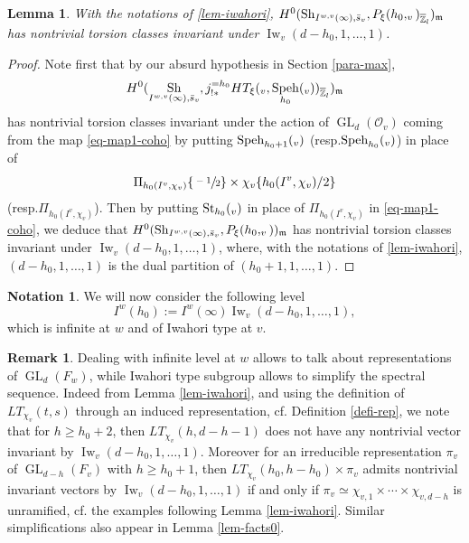 \documentclass[11pt]{article}
\makeatletter
\newcommand{\cf}{cf.\xspace}
\newcommand{\resp}{resp.\xspace}
\DeclareRobustCommand{\mathbbm}[1]{\csname jepbb@#1\endcsname}
\let\mathds\mathbbm
\DeclareMathOperator{\GL}{GL}
\theoremstyle{plain}
\newtheorem{lemma}[equation]{Lemma}
\theoremstyle{definition}
\newtheorem*{remark}{Remark}
\newtheorem{nota}[equation]{Notation}
\numberwithin{equation}{subsection}
\newcommand\Zm{{\mathbb Z}}
\newcommand\OC{{\mathcal O}}
\DeclareMathOperator{\sh}{Sh}
\DeclareMathOperator{\Iw}{Iw}
\DeclareMathOperator{\speh}{Speh}
\DeclareMathOperator{\st}{St}
\let \oo=\infty
\makeatother
\begin{document}
\begin{lemma} \label{lem-oo-finite}
With the notations of \ref{lem-iwahori},
$H^0(\sh_{I^{w,v}(\oo),\bar s_v},P_\xi(h_0,\mathds 1_v)_{\overline \Zm_l})_{\mathfrak m}$ has nontrivial torsion
classes invariant under $\Iw_v(d-h_0,1,\dots,1)$.
\end{lemma}

\begin{proof}
Note first that by our absurd hypothesis in Section \ref{para-max},
\[
H^0(\sh_{I^{w,v}(\oo),\bar s_v},j^{=h_0}_{!*}
HT_\xi(\mathds 1_v,\speh_{h_0}(\mathds 1_v))_{\overline \Zm_l})_{\mathfrak m}
\]
has
nontrivial torsion classes invariant under the action of $\GL_d(\OC_v)$ coming
from the map \eqref{eq-map1-coho} by putting
$\speh_{h_0+1}(\mathds 1_v)$ (\resp $\speh_{h_0}(\mathds 1_v)$)
in place of
\[
\Pi_{h_0(I^v,\chi_v)} \{\sfrac{-1}{2}\} \times \chi_v \{h_0(I^v,\chi_v)/2\}
\]
(\resp $\Pi_{h_0(I^v,\chi_v)}$).
Then by putting $\st_{h_0}(\mathds 1_v)$ in place of $\Pi_{h_0(I^v,\chi_v)}$
in \eqref{eq-map1-coho}, we deduce that
$H^0(\sh_{I^{w,v}(\oo),\bar s_v},P_\xi(h_0,\mathds 1_v))_{\mathfrak m}$ has nontrivial torsion
classes invariant under $\Iw_v(d-h_0,1,\dots,1)$, where, with
the notations of \ref{lem-iwahori}, $(d-h_0,1,\dots,1)$ is the dual
partition of $(h_0+1,1,\dots,1)$.
\end{proof}

\begin{nota}
We will now consider the following level
\[
I^w(h_0):=I^w(\oo) \Iw_v(d-h_0,1,\dots,1),
\]
which is infinite at $w$ and of Iwahori type at $v$.
\end{nota}

\begin{remark}
Dealing with infinite level at $w$ allows to talk about
representations of $\GL_d(F_w)$, while
Iwahori type subgroup allows to simplify the spectral sequence. Indeed
from Lemma \ref{lem-iwahori}, and using the definition of $LT_{\chi_v}(t,s)$
through an induced representation, \cf Definition \ref{defi-rep},
we note that
for $h \geq h_0+2$, then $LT_{\chi_v}(h,d-h-1)$ does not have any nontrivial
vector invariant by $\Iw_v(d-h_0,1,\dots,1)$. Moreover for an irreducible
representation $\pi_v$ of $\GL_{d-h}(F_v)$ with $h \geq h_0+1$,
then \hbox{$LT_{\chi_v}(h_0,h-h_0) \times \pi_v$}
admits nontrivial invariant vectors by $\Iw_v(d-h_0,1,\dots,1)$ if and only if
$\pi_v \simeq \chi_{v,1} \times \cdots \times \chi_{v,d-h}$ is unramified, \cf the
examples following Lemma \ref{lem-iwahori}.
Similar simplifications also appear in Lemma \ref{lem-facts0}.
\end{remark}
\end{document}
